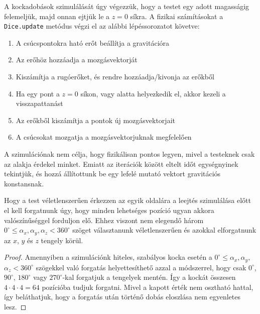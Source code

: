 
A kockadobások szimulálását úgy végezzük, hogy a testet egy adott magasságig felemeljük, majd onnan ejtjük le a $z=0$ síkra.
A fizikai számításokat a \texttt{Dice.update} metódus végzi el az alábbi lépéssorozatot követve:
\begin{enumerate}
	\item A csúcspontokra ható erőt beállítja a gravitációra
	\item Az erőhöz hozzáadja a mozgásvektorját
	\item Kiszámítja a rugóerőket, és rendre hozzáadja/kivonja az erőkből
	\item Ha egy pont a $z=0$ síkon, vagy alatta helyezkedik el, akkor kezeli a visszapattanást
	\item Az erőkből kiszámítja a pontok új mozgásvektorjait
	\item A csúcsokat mozgatja a mozgásvektorjuknak megfelelően 
\end{enumerate}
A szimulációnak nem célja, hogy fizikálisan pontos legyen, mivel a testeknek csak az alakja érdekel minket.
Emiatt az iterációk között eltelt időt egységnyinek tekintjük, és hozzá állítottunk be egy lefelé mutató vektort gravitációs konstansnak.

\label{subs:randompoint}

Hogy a test véletlenszerűen érkezzen az egyik oldalára a leejtés szimulálása előtt el kell forgatnunk úgy, hogy minden lehetséges pozíció ugyan akkora valószínűséggel forduljon elő.
Ehhez viszont nem elegendő három $0^\circ \leq \alpha_x,\alpha_y,\alpha_z <360^\circ$ szöget választanunk véletlenszerűen és azokkal elforgatnunk az $x$, $y$ és $z$ tengely körül.
\begin{proof}
Amennyiben a szimulációnk hiteles, szabályos kocka esetén a $0^\circ \leq \alpha_x,\alpha_y,$ $\alpha_z <360^\circ$ szögekkel való forgatás helyettesíthető azzal a módszerrel, hogy csak $0^\circ$, $90^\circ$, $180^\circ$ vagy $270^\circ$-kal forgatjuk a tengelyek mentén. Így a kockát összesen $4\cdot 4\cdot 4 = 64$ pozícióba tudjuk forgatni. Mivel a kapott érték nem osztható hattal, így beláthatjuk, hogy a forgatás után történő dobás eloszlása nem egyenletes lesz. 
\end{proof}

